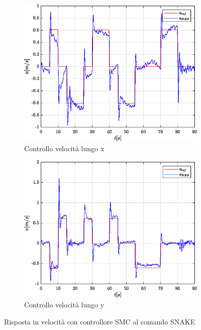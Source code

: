 \begin{figure}
	\centering
	\begin{subfigure}{0.45\textwidth}
		\centering
		\includegraphics[width=1\textwidth]{Simulazioni/Figure/SMC/SNAKE/PositionControlXVel}
		\caption{Controllo velocità lungo x}
		\label{fig:SNAKEerrvelxSMC}
	\end{subfigure}
	\hfill
	\begin{subfigure}{0.45\textwidth}
		\centering
		\includegraphics[width=1\textwidth]{Simulazioni/Figure/SMC/SNAKE/PositionControlYVel}
		\caption{Controllo velocità lungo y}
		\label{fig:SNAKEerrvelySMC}
	\end{subfigure}
	\caption{Risposta in velocità con controllore SMC al comando SNAKE}
\end{figure}

